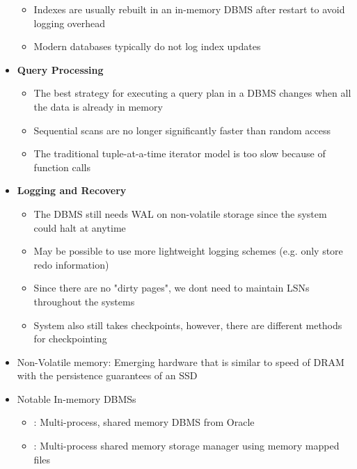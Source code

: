 \documentclass[11pt]{article}
\begin{document}
\begin{itemize}
\begin{itemize}
        \item Indexes are usually rebuilt in an in-memory DBMS after restart to avoid logging overhead
        \item Modern databases typically do not log index updates
    \end{itemize}
    \item \textbf{Query Processing}
    \begin{itemize}
        \item The best strategy for executing a query plan in a DBMS changes when all the data is already in memory
        \item Sequential scans are no longer significantly faster than random access
        \item The traditional tuple-at-a-time iterator model is too slow because of function calls
    \end{itemize}
    \item \textbf{Logging and Recovery}
    \begin{itemize}
        \item The DBMS still needs WAL on non-volatile storage since the system could halt at anytime
        \item May be possible to use more lightweight logging schemes (e.g. only store redo information)
        \item Since there are no "dirty pages", we dont need to maintain LSNs throughout the systems
        \item System also still takes checkpoints, however, there are different methods for checkpointing
    \end{itemize}
    \item Non-Volatile memory: Emerging hardware that is similar to speed of DRAM with the persistence guarantees of an SSD
    \item Notable In-memory DBMSs
    \begin{itemize}
        \item {}: Multi-process, shared memory DBMS from Oracle~\cite{lahiri13}
        \item {}: Multi-process shared memory storage manager using memory mapped files~\cite{Dali}
    \end{itemize}
\end{itemize}

\newpage


\end{document}
